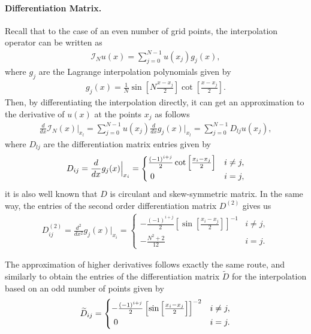    \paragraph{Differentiation Matrix.} Recall that to the case of an even number of grid points, the interpolation operator can be written as
    \begin{align*}
        \mathcal{I}_N u(x) = \displaystyle \sum^{N-1}_{j=0} u(x_j) g_j (x),
    \end{align*}
    where $g_j$ are the Lagrange interpolation polynomials given by
    \begin{align*}
        g_j (x) = \frac{1}{N} \sin\left[N \frac{x - x_j}{2} \right] \cot\left[\frac{x - x_j}{2} \right].
    \end{align*}
    Then, by differentiating the interpolation directly, it can get an approximation to the derivative of $u(x)$ at the points $x_j$ as follows
    \begin{align*}
        \displaystyle \frac{d}{dx} \mathcal{I}_N (x) \Big|_{x_l} = \sum^{N-1}_{j=0} u(x_j) \frac{d}{dx} g_j (x) \Big|_{x_l} = \sum^{N-1}_{j=0} D_{lj} u(x_j),
    \end{align*}
    where $D_{lj}$ are the differentiation matrix entries given by
    \begin{align}
    \label{matrix_DN_even}
        D_{ij} = \frac{d}{dx} g_j (x) \Big|_{x_i} = \begin{cases} \frac{(-1)^{i+j}}{2} \cot \left[ \frac{x_i - x_j}{2}\right] &   i \neq j, \\ \hspace{1mm} 0 &  i=j, \end{cases}
    \end{align}
    it is also well known that $D$ is circulant and skew-symmetric matrix. In the same way, the entries of the second order differentiation matrix $D^{(2)}$ gives us
    \begin{align}
    \label{matrix_D2N_even}
        D_{ij}^{(2)} = \frac{d^2}{dx^2} g_j (x) \Big|_{x_i} = \begin{cases} -\frac{(-1)^{i+j}}{2} \left[\sin \left[ \frac{x_i - x_j}{2}\right]\right]^{-1} &   i \neq j, \\ -\frac{N^2 + 2}{12} &  i=j. \end{cases}
    \end{align}
	
    The approximation of higher derivatives follows exactly the same route, and similarly to obtain the entries of the differentiation matrix $\widetilde{D}$ for the interpolation based on an odd number of points given by
    \begin{align}
    \label{matrix_DN_odd}
        \widetilde{D}_{ij} = \begin{cases} -\frac{(-1)^{i+j}}{2} \left[\sin \left[ \frac{x_i - x_j}{2}\right]\right]^{-2} &   i \neq j, \\ \hspace{1mm} 0 &  i=j. \end{cases}
    \end{align}

